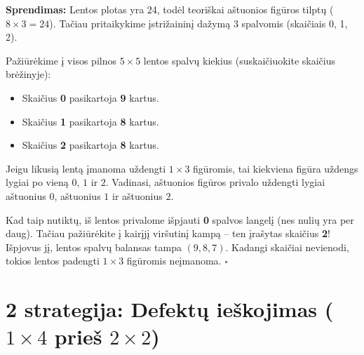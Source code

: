 \documentclass[11pt,a4paper]{scrartcl}
\newenvironment{solution}
    {\begin{list}{}{\setlength{\leftmargin}{10pt}\setlength{\rightmargin}{10pt}}\item[]}
    {\end{list}}
\begin{document}
\begin{solution}
\textbf{Sprendimas:}
Lentos plotas yra 24, todėl teoriškai aštuonios figūros tilptų ($8 \times 3 = 24$). Tačiau pritaikykime įstrižaininį dažymą 3 spalvomis (skaičiais 0, 1, 2).

\begin{center}
\end{center}

Pažiūrėkime į visos pilnos $5 \times 5$ lentos spalvų kiekius (suskaičiuokite skaičius brėžinyje):
\begin{itemize}
    \item Skaičius \textbf{0} pasikartoja \textbf{9} kartus.
    \item Skaičius \textbf{1} pasikartoja \textbf{8} kartus.
    \item Skaičius \textbf{2} pasikartoja \textbf{8} kartus.
\end{itemize}
Jeigu likusią lentą įmanoma uždengti $1 \times 3$ figūromis, tai kiekviena figūra uždengs lygiai po vieną $0$, $1$ ir $2$. Vadinasi, aštuonios figūros privalo uždengti lygiai aštuonius $0$, aštuonius $1$ ir aštuonius $2$. 

Kad taip nutiktų, iš lentos privalome išpjauti \textbf{0} spalvos langelį (nes nulių yra per daug). Tačiau pažiūrėkite į kairįjį viršutinį kampą – ten įrašytas skaičius \textbf{2}! Išpjovus jį, lentos spalvų balansas tampa $(9, 8, 7)$. Kadangi skaičiai nevienodi, tokios lentos padengti $1 \times 3$ figūromis neįmanoma. \hfill $\square$
\end{solution}

\section{2 strategija: Defektų ieškojimas ($1 \times 4$ prieš $2 \times 2$)}
\end{document}
